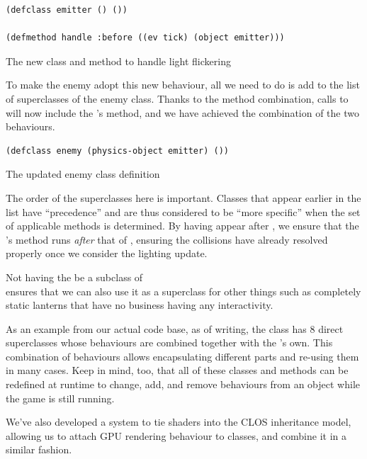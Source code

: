 \documentclass[a4paper]{paper}
\begin{document}
\begin{listing}[h]
\begin{verbatim}
(defclass emitter () ())

(defmethod handle :before ((ev tick) (object emitter)))
\end{verbatim}
\caption{The new class and method to handle light flickering}
\label{lst:emitter}
\end{listing}

To make the enemy adopt this new behaviour, all we need to do is add  to the  list of superclasses of the enemy class. Thanks to the method combination, calls to  will now include the 's method, and we have achieved the combination of the two behaviours.

\begin{listing}[H]
\begin{verbatim}
(defclass enemy (physics-object emitter) ())
\end{verbatim}
\caption{The updated enemy class definition}
\label{lst:new-enemy}
\end{listing}

The order of the superclasses here is important. Classes that appear earlier in the list have ``precedence'' and are thus considered to be ``more specific'' when the set of applicable methods is determined. By having  appear after , we ensure that the 's  method runs \textit{after} that of , ensuring the collisions have already resolved properly once we consider the lighting update.

Not having the  be a subclass of \\ ensures that we can also use it as a superclass for other things such as completely static lanterns that have no business having any interactivity.

As an example from our actual code base, as of writing, the  class has 8 direct superclasses whose behaviours are combined together with the 's own. This combination of behaviours allows encapsulating different parts and re-using them in many cases. Keep in mind, too, that all of these classes and methods can be redefined at runtime to change, add, and remove behaviours from an object while the game is still running.

We've also developed a system to tie shaders into the CLOS inheritance model, allowing us to attach GPU rendering behaviour to classes, and combine it in a similar fashion\cite{hafner2019shader}.
\end{document}

